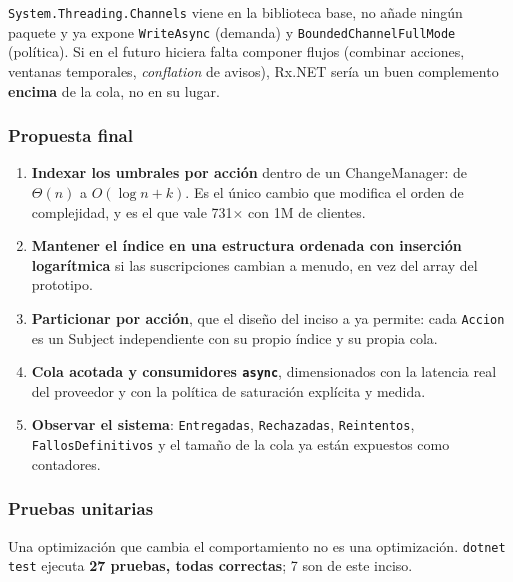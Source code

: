 \texttt{System.Threading.Channels} viene en la biblioteca base, no añade ningún paquete y ya
expone \texttt{WriteAsync} (demanda) y \texttt{BoundedChannelFullMode} (política). Si en el
futuro hiciera falta componer flujos (combinar acciones, ventanas temporales,
\emph{conflation} de avisos), Rx.NET sería un buen complemento \textbf{encima} de la cola, no
en su lugar.

\subsubsection{Propuesta final}

\begin{enumerate}
  \item \textbf{Indexar los umbrales por acción} dentro de un ChangeManager: de $\Theta(n)$ a
        $O(\log n + k)$. Es el único cambio que modifica el orden de complejidad, y es el que
        vale 731$\times$ con 1M de clientes.
  \item \textbf{Mantener el índice en una estructura ordenada con inserción logarítmica} si
        las suscripciones cambian a menudo, en vez del array del prototipo.
  \item \textbf{Particionar por acción}, que el diseño del inciso a ya permite: cada
        \texttt{Accion} es un Subject independiente con su propio índice y su propia cola.
  \item \textbf{Cola acotada y consumidores \texttt{async}}, dimensionados con la latencia
        real del proveedor y con la política de saturación explícita y medida.
  \item \textbf{Observar el sistema}: \texttt{Entregadas}, \texttt{Rechazadas},
        \texttt{Reintentos}, \texttt{FallosDefinitivos} y el tamaño de la cola ya están
        expuestos como contadores.
\end{enumerate}

\subsubsection{Pruebas unitarias}

Una optimización que cambia el comportamiento no es una optimización. \texttt{dotnet test}
ejecuta \textbf{27 pruebas, todas correctas}; 7 son de este inciso.

